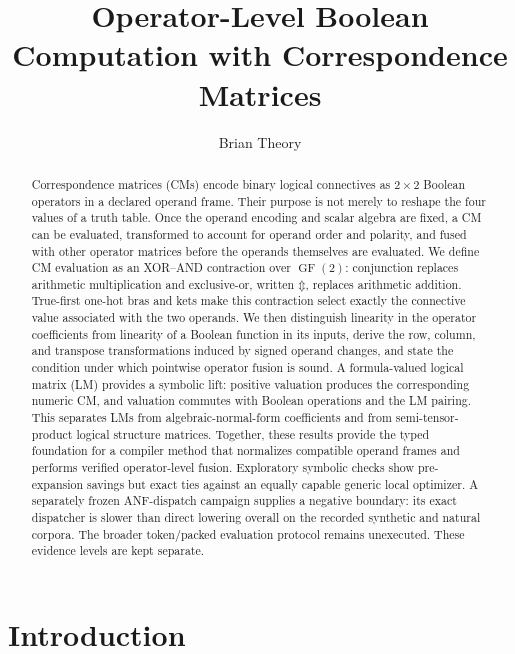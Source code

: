 \documentclass[11pt]{article}
\title{Operator-Level Boolean Computation with Correspondence Matrices}
\author{Brian Theory}
\date{}
\newcommand{\GFtwo}{\operatorname{GF}(2)}
\newcommand{\XOR}{\mathbin{\Updownarrow}}
\begin{document}
\maketitle

\begin{abstract}
Correspondence matrices (CMs) encode binary logical connectives as
$2\times2$ Boolean operators in a declared operand frame. Their purpose is not
merely to reshape the four values of a truth table. Once the operand encoding
and scalar algebra are fixed, a CM can be evaluated, transformed to account
for operand order and polarity, and fused with other operator matrices before
the operands themselves are evaluated. We define CM evaluation as an
XOR--AND contraction over $\GFtwo$: conjunction replaces arithmetic
multiplication and exclusive-or, written $\XOR$, replaces arithmetic addition.
True-first one-hot bras and kets make this contraction select exactly the
connective value associated with the two operands. We then distinguish
linearity in the operator coefficients from linearity of a Boolean function
in its inputs, derive the row, column, and transpose transformations induced
by signed operand changes, and state the condition under which pointwise
operator fusion is sound. A formula-valued logical matrix (LM) provides a
symbolic lift: positive valuation produces the corresponding numeric CM, and
valuation commutes with Boolean operations and the LM pairing. This separates
LMs from algebraic-normal-form coefficients and from semi-tensor-product
logical structure matrices. Together, these results provide the typed
foundation for a compiler method that normalizes compatible operand frames
and performs verified operator-level fusion. Exploratory symbolic checks show
pre-expansion savings but exact ties against an equally capable generic local
optimizer. A separately frozen ANF-dispatch campaign supplies a negative
boundary: its exact dispatcher is slower than direct lowering overall on the
recorded synthetic and natural corpora. The broader token/packed evaluation
protocol remains unexecuted. These evidence levels are kept separate.
\end{abstract}


\section{Introduction}
\label{sec:introduction}
\end{document}
